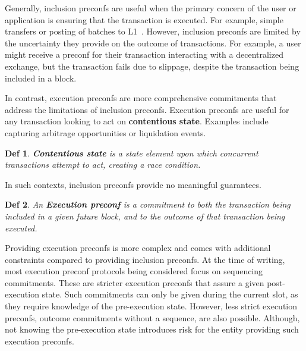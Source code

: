 \documentclass[a4paper]{article}
\theoremstyle{boldstyle}
\newtheorem*{definitionx}{Def}
\newenvironment{definition}
  {\begin{defopenboxq}\begin{definitionx}}
  {\end{definitionx}\end{defopenboxq}}
\begin{document}
        Generally, inclusion preconfs are useful when the primary concern of the user or application is ensuring that the transaction is executed. For example, simple transfers or posting of batches to L1~\cite{W:PreconfirmationsforVanillaBasedRollups,W:APricingModelforInclusionPreconfirmations}.  
        However, inclusion preconfs are limited by the uncertainty they provide on the outcome of transactions. For example, a user might receive a preconf for their transaction interacting with a decentralized exchange, but the transaction fails due to slippage, despite the transaction being included in a block. 

        In contrast, execution preconfs are more comprehensive commitments that address the limitations of inclusion preconfs.
        Execution preconfs are useful for any transaction looking to act on \textbf{contentious state}. Examples include capturing arbitrage opportunities or liquidation events.
        \begin{definition}
        \textbf{Contentious state} is a state element upon which concurrent transactions attempt to act, creating a race condition.
        \end{definition}
        In such contexts, inclusion preconfs provide no meaningful guarantees.
        \begin{definition}
        An \textbf{Execution preconf} is a commitment to both the transaction being included in a given future block, and to the outcome of that transaction being executed.
        \end{definition}
        Providing execution preconfs is more complex and comes with additional constraints compared to providing inclusion preconfs.
        At the time of writing, most execution preconf protocols being considered focus on sequencing commitments. These are stricter execution preconfs that assure a given post-execution state. Such commitments can only be given during the current slot, as they require knowledge of the pre-execution state. However, less strict execution preconfs, outcome commitments without a sequence, are also possible. Although, not knowing the pre-execution state introduces risk for the entity providing such execution preconfs.

\end{document}
